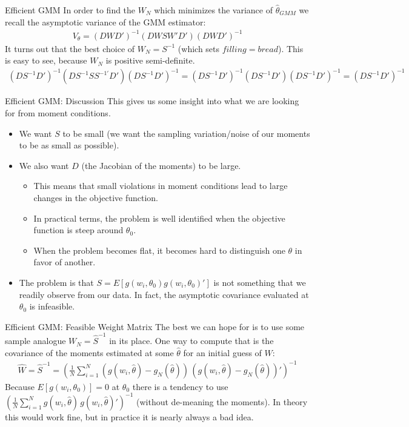 \documentclass[aspectratio=169]{beamer}
\begin{document}
\begin{frame}{Efficient GMM}
 In order to find the $W_N$ which minimizes the variance of $\hat{\theta}_{GMM}$ we recall the asymptotic variance of the GMM estimator:
\begin{eqnarray*}
V_{\theta} =(D W D')^{-1} (D W S W' D') (D W D')^{-1}
\end{eqnarray*}
It turns out that the best choice of $W_N = S^{-1}$ (which sets $filling = bread$). This is easy to see, because $W_N$ is positive semi-definite.
\begin{eqnarray*}
(D S^{-1} D')^{-1} (D S^{-1} S S^{-1'} D') (D S^{-1} D')^{-1} = (D S^{-1} D')^{-1} (D S^{-1} D') (D S^{-1} D')^{-1} = (D S^{-1} D')^{-1}
\end{eqnarray*}
\end{frame}

\begin{frame}{Efficient GMM: Discussion}
This gives us some insight into what we are looking for from moment conditions. 

\begin{itemize}
\item We want $S$ to be small (we want the sampling variation/noise of our moments to be as small as possible). 
\item We also want $D$ (the Jacobian of the moments) to be large. 
\begin{itemize}
\item This means that small violations in moment conditions lead to large changes in the objective function. 
\item In practical terms, the problem is well identified when the objective function is steep around $\theta_0$.
\item When the problem becomes flat, it becomes hard to distinguish one $\theta$ in favor of another.
\end{itemize}
\item The problem is that $S = E[g(w_i,\theta_0) g(w_i,\theta_0)']$ is not something that we readily observe from our data. In fact, the asymptotic covariance evaluated at $\theta_0$ is \alert{infeasible}.
\end{itemize}
\end{frame}

\begin{frame}{Efficient GMM: Feasible Weight Matrix}
The best we can hope for is to use some sample analogue $W_N=\hat{S}^{-1}$ in its place. One way to compute that is the covariance of the moments estimated at some $\hat{\theta}$ for an initial guess of $W$:
\begin{eqnarray*}
\hat{W} = \hat{S}^{-1} = \left(\frac{1}{N} \sum_{i=1}^N (g(w_i,\hat{\theta}) - g_N(\hat{\theta}))  \, (g(w_i,\hat{\theta}) - g_N(\hat{\theta}))'\right)^{-1}
\end{eqnarray*}
Because $E[g(w_i,\theta_0)]=0$ at $\theta_0$ there is a tendency to use $\left(\frac{1}{N} \sum_{i=1}^N g(w_i,\hat{\theta}) \, g(w_i,\hat{\theta} )'\right)^{-1}$ (without de-meaning the moments). In theory this would work fine, but in practice \alert{it is nearly always a bad idea}.\\
\end{frame}
\end{document}
